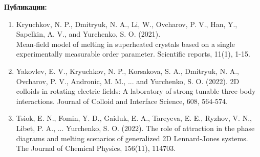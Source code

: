 \textbf{Публикации:}
\begin{enumerate}
\item Kryuchkov, N. P., Dmitryuk, N. A., Li, W., Ovcharov, P. V., Han, Y., Sapelkin, A. V., and Yurchenko, S. O. (2021). \\ Mean-field model of melting in superheated crystals based on a single \\ experimentally measurable order parameter. Scientific reports, 11(1), 1-15.
\item Yakovlev, E. V., Kryuchkov, N. P., Korsakova, S. A., Dmitryuk, N. A., Ovcharov, P. V., Andronic, M. M., ... and Yurchenko, S. O. (2022). 2D colloids in rotating electric fields: A laboratory of strong tunable three-body interactions. Journal of Colloid and Interface Science, 608, 564-574.
\item Tsiok, E. N., Fomin, Y. D., Gaiduk, E. A., Tareyeva, E. E., Ryzhov, V. N., Libet, P. A., ... Yurchenko, S. O. (2022). The role of attraction in the phase diagrams and melting scenarios of generalized 2D Lennard-Jones systems. The Journal of Chemical Physics, 156(11), 114703.
\end{enumerate}
